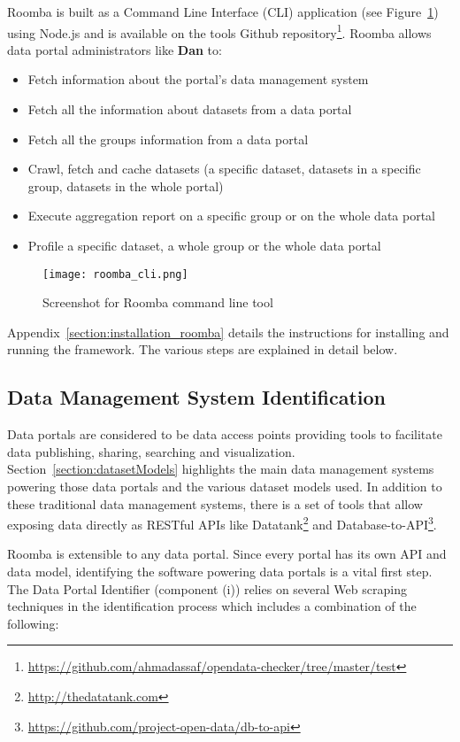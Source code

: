 \pagebreak
Roomba is built as a Command Line Interface (CLI) application (see Figure~\ref{fig:roomba_cli}) using Node.js and is available on the tools Github repository\footnote{\url{https://github.com/ahmadassaf/opendata-checker/tree/master/test}}. Roomba allows data portal administrators like \textbf{Dan} to:

\begin{itemize}
  \item Fetch information about the portal's data management system
	\item Fetch all the information about datasets from a data portal
	\item Fetch all the groups information from a data portal
	\item Crawl, fetch and cache datasets (a specific dataset, datasets in a specific group, 	datasets in the whole portal)
	\item Execute aggregation report on a specific group or on the whole data portal
	\item Profile a specific dataset, a whole group or the whole data portal
\end{itemize}

\begin{figure}[!ht]
  \centering
  \texttt{[image: roomba\_cli.png]}
  \caption{Screenshot for Roomba command line tool}
  \label{fig:roomba_cli}
\end{figure}

Appendix~\ref{section:installation_roomba} details the instructions for installing and running the framework. The various steps are explained in detail below.

\subsection{Data Management System Identification}
Data portals are considered to be data access points providing tools to facilitate data publishing, sharing, searching and visualization. Section~\ref{section:datasetModels} highlights the main data management systems powering those data portals and the various dataset models used. In addition to these traditional data management systems, there is a set of tools that allow exposing data directly as RESTful APIs like Datatank\footnote{\url{http://thedatatank.com}} and Database-to-API\footnote{\url{https://github.com/project-open-data/db-to-api}}.

Roomba is extensible to any data portal. Since every portal has its own API and data model, identifying the software powering data portals is a vital first step. The Data Portal Identifier (component (i)) relies on several Web scraping techniques in the identification process which includes a combination of the following:

